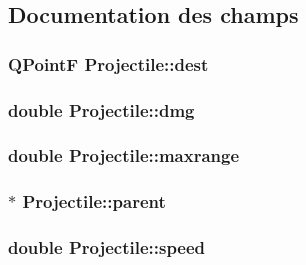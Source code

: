 \subsection{Documentation des champs}
\hypertarget{classProjectile_a15091a3a02fbfac2dd4fb44ac9cbceab}{
\subsubsection[{dest}]{\setlength{\rightskip}{0pt plus 5cm}QPointF {\bf Projectile::dest}}}
\label{classProjectile_a15091a3a02fbfac2dd4fb44ac9cbceab}
\hypertarget{classProjectile_ac94938ed5b3d3e01217bf72f80ad2e3d}{
\subsubsection[{dmg}]{\setlength{\rightskip}{0pt plus 5cm}double {\bf Projectile::dmg}}}
\label{classProjectile_ac94938ed5b3d3e01217bf72f80ad2e3d}
\hypertarget{classProjectile_a019db4c89ccf3eb291b06ba7b55f0754}{
\subsubsection[{maxrange}]{\setlength{\rightskip}{0pt plus 5cm}double {\bf Projectile::maxrange}}}
\label{classProjectile_a019db4c89ccf3eb291b06ba7b55f0754}
\hypertarget{classProjectile_a04924a3bccf3393aaa0f57d9384f617d}{
\subsubsection[{parent}]{$\ast$ {\bf Projectile::parent}}}
\label{classProjectile_a04924a3bccf3393aaa0f57d9384f617d}
\hypertarget{classProjectile_aae1f5d683c71d152b6a12d922ec4714f}{
\subsubsection[{speed}]{\setlength{\rightskip}{0pt plus 5cm}double {\bf Projectile::speed}}}
